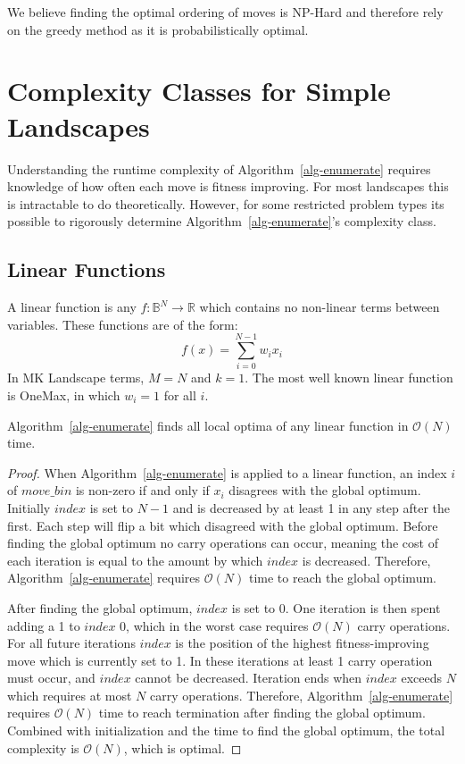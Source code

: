 \documentclass[runningheads,a4paper]{llncs}
\newcommand{\BigO}[1]{$\mathcal{O}{(#1)}$}
\begin{document}
We believe finding the optimal ordering of moves is NP-Hard and therefore rely on
the greedy method as it is probabilistically optimal.

\section{Complexity Classes for Simple Landscapes}
Understanding the runtime complexity of Algorithm~\ref{alg-enumerate} requires
knowledge of how often each move is fitness improving. For most landscapes
this is intractable to do theoretically. However, for some restricted problem
types its possible to rigorously determine Algorithm~\ref{alg-enumerate}'s complexity class.

\subsection{Linear Functions}
A linear function is any $f : \mathbb{B}^{N}\rightarrow \mathbb{R}$ which contains
no non-linear terms between variables. These functions are of the form:
\begin{equation}
  f(x) = \sum_{i=0}^{N-1} w_ix_i
  \label{eq-linear}
\end{equation}
In MK Landscape terms, $M=N$ and $k=1$. The most well known linear function is OneMax,
in which $w_i=1$ for all $i$.

\begin{theorem}
Algorithm~\ref{alg-enumerate} finds all local optima of any linear function
in \BigO{N} time.
\end{theorem}

\begin{proof}
When Algorithm~\ref{alg-enumerate} is applied to a linear
function, an index $i$ of $move\_bin$ is non-zero if and only if
$x_i$ disagrees with the global optimum.
Initially $index$ is set to $N-1$ and is decreased by at least 1 in any step after the first.
Each step will flip a bit which disagreed with the global optimum.
Before finding the global optimum no carry operations can occur, meaning the
cost of each iteration is equal to the amount by which $index$ is decreased.
Therefore, Algorithm~\ref{alg-enumerate} requires \BigO{N} time to reach
the global optimum.

After finding the global optimum, $index$ is set to 0. One iteration
is then spent adding a 1 to $index$ 0, which in the worst case requires \BigO{N}
carry operations. For all future iterations $index$ is the position of the highest fitness-improving move
which is currently set to 1. In these iterations at least 1 carry operation must
occur, and $index$ cannot be decreased. Iteration ends when $index$ exceeds $N$
which requires at most $N$ carry operations. Therefore, Algorithm~\ref{alg-enumerate}
requires \BigO{N} time to reach termination after finding the global optimum. Combined
with initialization and the time to find the global optimum, the total complexity is \BigO{N},
which is optimal.
\end{proof}
\end{document}
